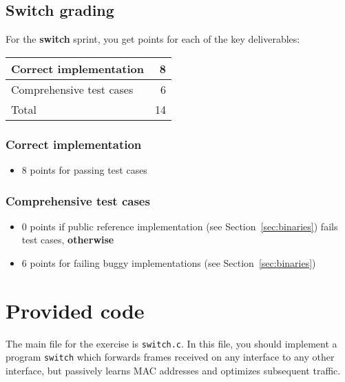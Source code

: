 \documentclass{article}
\begin{document}




\subsection{Switch grading}

For the {\bf switch} sprint, you get points for each of the key deliverables:
\begin{center}
\begin{tabular}{l|r}
Correct implementation                    &  8 \\ \hline
Comprehensive test cases                  &  6 \\ \hline \hline
Total                                     & 14
\end{tabular}
\end{center}

\subsubsection{Correct implementation}
\begin{itemize}
  \item 8 points for passing test cases
\end{itemize}

\subsubsection{Comprehensive test cases}
\begin{itemize}
\item 0 points if public reference implementation (see Section~\ref{sec:binaries})
      fails test cases, {\bf otherwise}
\item 6 points for failing buggy implementations (see Section~\ref{sec:binaries})
\end{itemize}





\section{Provided code}



The main file for the exercise is {\tt switch.c}. In this file, you should
implement a program {\tt switch} which forwards frames received on any
interface to any other interface, but passively learns MAC addresses
and optimizes subsequent traffic.
\end{document}
